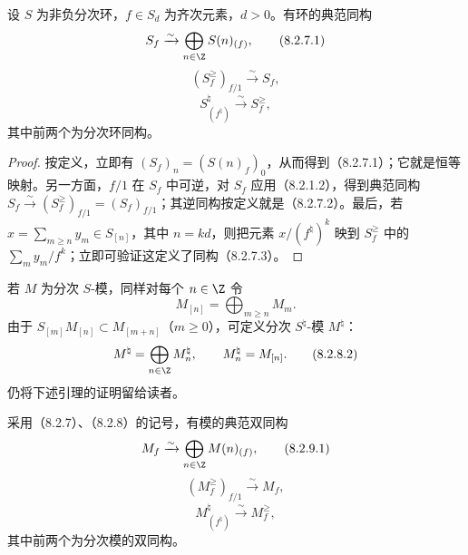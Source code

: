 设 $S$ 为非负分次环，$f\in S_d$ 为齐次元素，$d>0$。有环的典范同构
\begin{equation}
S_f\xrightarrow{\sim}\bigoplus_{n\in\Z}S(n)_{(f)},
\tag{8.2.7.1}
\end{equation}
\begin{equation}
(S_f^{\geq})_{f/1}\xrightarrow{\sim}S_f,
\tag{8.2.7.2}
\end{equation}
\begin{equation}
S^{\natural}_{(f^{\natural})}\xrightarrow{\sim}S_f^{\geq},
\tag{8.2.7.3}
\end{equation}
其中前两个为分次环同构。
\begin{proof}
按定义，立即有 $(S_f)_n=(S(n)_f)_0$，从而得到（8.2.7.1）；它就是恒等映射。另一方面，$f/1$ 在 $S_f$ 中可逆，对 $S_f$ 应用（8.2.1.2），得到典范同构 $S_f\xrightarrow{\sim}(S_f^{\geq})_{f/1}=(S_f)_{f/1}$；其逆同构按定义就是（8.2.7.2）。最后，若 $x=\sum_{m\geq n}y_m\in S_{[n]}$，其中 $n=kd$，则把元素 $x/(f^{\natural})^k$ 映到 $S_f^{\geq}$ 中的 $\sum_m y_m/f^k$；立即可验证这定义了同构（8.2.7.3）。
\end{proof}

若 $M$ 为分次 $S$-模，同样对每个 $n\in\Z$ 令
\begin{equation}
M_{[n]}=\bigoplus_{m\geq n}M_m.
\tag{8.2.8.1}
\end{equation}
由于 $S_{[m]}M_{[n]}\subset M_{[m+n]}$（$m\geq0$），可定义分次 $S^{\natural}$-模 $M^{\natural}$：
\begin{equation}
M^{\natural}=\bigoplus_{n\in\Z}M_n^{\natural},\qquad M_n^{\natural}=M_{[n]}.
\tag{8.2.8.2}
\end{equation}
仍将下述引理的证明留给读者。

采用（8.2.7）、（8.2.8）的记号，有模的典范双同构
\begin{equation}
M_f\xrightarrow{\sim}\bigoplus_{n\in\Z}M(n)_{(f)},
\tag{8.2.9.1}
\end{equation}
\begin{equation}
(M_f^{\geq})_{f/1}\xrightarrow{\sim}M_f,
\tag{8.2.9.2}
\end{equation}
\begin{equation}
M^{\natural}_{(f^{\natural})}\xrightarrow{\sim}M_f^{\geq},
\tag{8.2.9.3}
\end{equation}
其中前两个为分次模的双同构。

